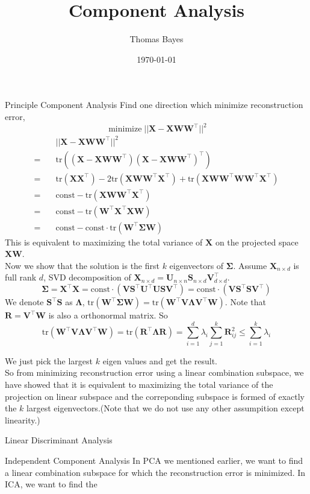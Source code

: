 \documentclass{beamer}
\title{Component Analysis}
\author{Thomas Bayes}
\institute{
\texttt{[image: ../bayes.png]}%
}
\date{\today}
\def\X{\mathbf{X}}
\def\w{\mathbf{w}}
\def\W{\mathbf{W}}
\def\const{\mathrm{const}}
\def\Var{\mathrm{Var}}
\def\tr{\mathrm{tr}}
\def\T{\top}
\def\U{\mathbf{U}}
\def\S{\mathbf{S}}
\def\V{\mathbf{V}}
\newcommand{\minimize}{\mathop{\mathrm{minimize}}}
\newcommand{\maximize}{\mathop{\mathrm{maximize}}}
\begin{document}
    
\frame{\titlepage}

\begin{frame}[allowframebreaks]{Principle Component Analysis}
Find one direction which minimize reconstruction error,
$$\minimize ||\X - \X \W \W^\T||^2 $$
\begin{align*}
& ||\X - \X \W \W^\T||^2 \\
= \quad & \tr ((\X - \X \W \W^\T) (\X - \X \W \W^\T)^\T) \\
= \quad & \tr(\X \X^\T) - 2 \tr(\X \W \W^\T \X^\T) + \tr (\X \W \W^\T \W \W^\T \X^\T) \\ 
= \quad & \const - \tr (\X \W \W^\T \X^\T) \\
= \quad & \const - \tr (\W^\T \X^\T \X  \W) \\
= \quad & \const - \const \cdot \tr (\W^\T \mathbf{\Sigma} \W)
\end{align*}
This is equivalent to maximizing the total variance of $\X$ on the projected space $\X\W$. \\
\framebreak
Now we show that the solution is the first $k$ eigenvectors of $\mathbf{\Sigma}$. Assume $\X_{n \times d}$ is full rank $d$, SVD decomposition of 
$\X_{n \times d} = \U_{n \times n} \S_{n \times d} \V_{d \times d}^\T$. $$\mathbf{\Sigma} = \X^\T \X = \const \cdot (\V \S^\T \U^\T \U \S \V^\T) = \const \cdot (\V \S^\T \S \V^\T)$$
We denote $\S^\T \S$ as $\mathbf{\Lambda}$, $\tr (\W^\T \mathbf{\Sigma} \W) = \tr (\W^\T \V \mathbf{\Lambda} \V^\T \W)$. Note that $\mathbf{R} = \V^\T \W$ is also a orthonormal matrix. So $$\tr (\W^\T \V \mathbf{\Lambda} \V^\T \W) = \tr (\mathbf{R}^\T \mathbf{\Lambda} \mathbf{R}) = \sum_{i=1}^d \lambda_i \sum_{j=1}^k\mathbf{R}_{ij}^2 \le \sum_{i=1}^k \lambda_i$$

We just pick the largest $k$ eigen values and get the result. \\
\framebreak
So from minimizing reconstruction error using a linear combination subspace, we have showed that it is equivalent to maximizing the total variance of the projection on linear subspace and the correponding subspace is formed of exactly the $k$ largest eigenvectors.(Note that we do not use any other assumpition except linearity.)
\end{frame}



\begin{frame}[allowframebreaks]{Linear Discriminant Analysis}

\end{frame}

\begin{frame}[allowframebreaks]{Independent Component Analysis}
In PCA we mentioned earlier, we want to find a linear combination subspace for which the reconstruction error is minimized. In ICA, we want to find the 
\end{frame}
\end{document}
